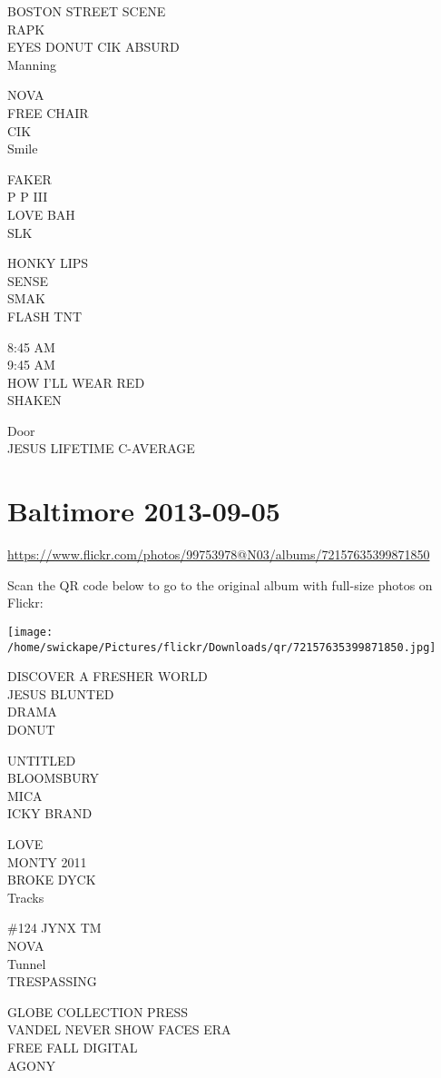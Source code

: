 \documentclass[10pt,letterpaper]{article}
\begin{document}
BOSTON STREET SCENE\\
RAPK\\
EYES DONUT CIK ABSURD\\
Manning

NOVA\\
FREE CHAIR\\
CIK\\
Smile

FAKER\\
P P III\\
LOVE BAH\\
SLK

HONKY LIPS\\
SENSE\\
SMAK\\
FLASH TNT

8:45 AM\\
9:45 AM\\
HOW I'LL WEAR RED\\
SHAKEN

Door\\
JESUS LIFETIME C{-}AVERAGE


\section*{Baltimore 2013-09-05}

\url{https://www.flickr.com/photos/99753978@N03/albums/72157635399871850}

Scan the QR code below to go to the original album with full-size photos on Flickr:

\texttt{[image: /home/swickape/Pictures/flickr/Downloads/qr/72157635399871850.jpg]}


DISCOVER A FRESHER WORLD\\
JESUS BLUNTED\\
DRAMA\\
DONUT

UNTITLED\\
BLOOMSBURY\\
MICA\\
ICKY BRAND

LOVE\\
MONTY 2011\\
BROKE DYCK\\
Tracks

\#124 JYNX TM\\
NOVA\\
Tunnel\\
TRESPASSING

GLOBE COLLECTION PRESS\\
VANDEL NEVER SHOW FACES ERA\\
FREE FALL DIGITAL\\
AGONY
\end{document}
